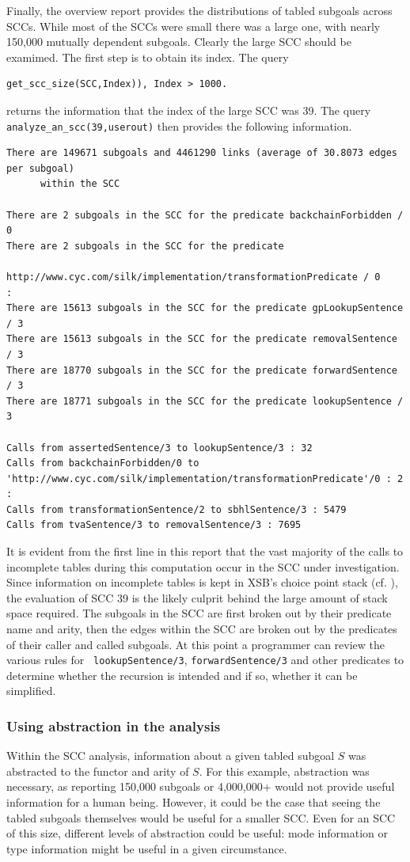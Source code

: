 \begin{example}
Finally, the overview report provides the distributions of tabled
subgoals across SCCs.  While most of the SCCs were small there was a
large one, with nearly 150,000 mutually dependent subgoals.  Clearly
the large SCC should be examimed.  The first step is to obtain its
index.  The query
%
\begin{verbatim}
get_scc_size(SCC,Index)), Index > 1000.
\end{verbatim}
%
returns the information that the index of the large SCC was 39.  The
query {\tt analyze\_an\_scc(39,userout)} then provides the following
information.
%
\begin{verbatim}
There are 149671 subgoals and 4461290 links (average of 30.8073 edges per subgoal) 
      within the SCC

There are 2 subgoals in the SCC for the predicate backchainForbidden / 0
There are 2 subgoals in the SCC for the predicate 
                   http://www.cyc.com/silk/implementation/transformationPredicate / 0
:
There are 15613 subgoals in the SCC for the predicate gpLookupSentence / 3
There are 15613 subgoals in the SCC for the predicate removalSentence / 3
There are 18770 subgoals in the SCC for the predicate forwardSentence / 3
There are 18771 subgoals in the SCC for the predicate lookupSentence / 3

Calls from assertedSentence/3 to lookupSentence/3 : 32
Calls from backchainForbidden/0 to 'http://www.cyc.com/silk/implementation/transformationPredicate'/0 : 2
:
Calls from transformationSentence/2 to sbhlSentence/3 : 5479
Calls from tvaSentence/3 to removalSentence/3 : 7695
\end{verbatim}
%
It is evident from the first line in this report that the vast
majority of the calls to incomplete tables during this computation
occur in the SCC under investigation.  Since information on incomplete
tables is kept in XSB's choice point stack (cf. \cite{SaSw98}), the
evaluation of SCC 39 is the likely culprit behind the large amount of
stack space required.  The subgoals in the SCC are first broken out by
their predicate name and arity, then the edges within the SCC are
broken out by the predicates of their caller and called subgoals.  At
this point a programmer can review the various rules for {\tt
  lookupSentence/3}, {\tt forwardSentence/3} and other predicates to
determine whether the recursion is intended and if so, whether it can
be simplified.
%
\end{example}

\subsubsection{Using abstraction in the analysis}
%
Within the SCC analysis, information about a given tabled subgoal $S$
was abstracted to the functor and arity of $S$.  For this example,
abstraction was necessary, as reporting 150,000 subgoals or 4,000,000+
would not provide useful information for a human being.  However, it
could be the case that seeing the tabled subgoals themselves would be
useful for a smaller SCC.  Even for an SCC of this size, different
levels of abstraction could be useful: mode information or type
information might be useful in a given circumstance.  


